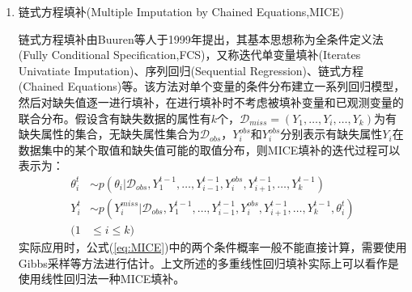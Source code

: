 \documentclass[a4paper]{ctexart}
\begin{document}
\begin{enumerate}





	\item 链式方程填补(Multiple Imputation by Chained Equations,MICE)\cite{RN181,RN182,RN183}

	      链式方程填补由Buuren等人于1999年提出，其基本思想称为全条件定义法(Fully Conditional Specification,FCS)，又称迭代单变量填补(Iterates Univatiate Imputation)、序列回归(Sequential Regression)、链式方程(Chained Equations)等。该方法对单个变量的条件分布建立一系列回归模型，然后对缺失值逐一进行填补，在进行填补时不考虑被填补变量和已观测变量的联合分布。假设含有缺失数据的属性有$k$个，$\mathcal{D}_{miss}=\left(Y_1,\dots,Y_i,\dots,Y_k\right)$为有缺失属性的集合，无缺失属性集合为$\mathcal{D}_{obs}$，$Y_i^{obs}$和$Y_i^{obs}$分别表示有缺失属性$Y_i$在数据集中的某个取值和缺失值可能的取值分布，则MICE填补的迭代过程可以表示为：
	      \begin{equation}\label{eq:MICE}
		      \begin{split}
			      \theta_i^t&\sim p\left(\theta_i|\mathcal{D}_{obs},Y_1^{t-1},\dots,Y_{i-1}^{t-1},Y_{i}^{obs},Y_{i+1}^{t-1},\dots,Y_k^{t-1}\right)\\
			      Y_i^t&\sim p\left(Y_i^{miss}|\mathcal{D}_{obs},Y_1^{t-1},\dots,Y_{i-1}^{t-1},Y_{i}^{obs},Y_{i+1}^{t-1},\dots,Y_k^{t-1},\theta_i^t\right)\\
			      (1&\leq i\leq k)
		      \end{split}
	      \end{equation}
	      实际应用时，公式(\ref{eq:MICE})中的两个条件概率一般不能直接计算，需要使用Gibbs采样\cite{RN176}等方法进行估计。上文所述的多重线性回归填补实际上可以看作是使用线性回归法一种MICE填补。


\end{enumerate}
\end{document}

